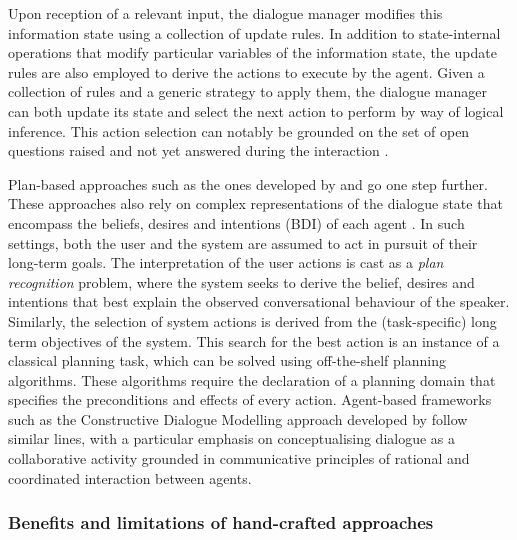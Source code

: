 Upon reception of a relevant input, the dialogue manager modifies this information state using a collection of update rules. In addition to state-internal operations that modify particular variables of the information state, the update rules are also employed to derive the actions to execute by the agent.  Given a collection of rules and a generic strategy to apply them, the dialogue manager can both update its state and select the next action to perform by way of logical inference. This action selection can notably be grounded on the set of open questions raised and not yet answered during the interaction \citep{larsson2002,Ginzburg2012}.  

Plan-based approaches such as the ones developed by \cite{Freedman:2000} and \cite{Allen:2001} go one step further. These approaches also rely on complex representations of the dialogue state that encompass the beliefs, desires and intentions (BDI) of each agent \citep{Cohen1979,Allen1980}.  In such settings, both the user and the system are assumed to act in pursuit of their long-term goals.  The interpretation of the user actions is cast as a \textit{plan recognition} problem, where the system seeks to derive the belief, desires and intentions that best explain the observed conversational behaviour of the speaker.  Similarly, the selection of system actions is derived from the (task-specific) long term objectives of the system. This search for the best action is an instance of a classical planning task, which can be solved using off-the-shelf planning algorithms. These algorithms require the declaration of a planning domain that specifies the preconditions and effects of every action. Agent-based frameworks such as the Constructive Dialogue Modelling approach developed by \cite{Jokinen:2009} follow similar lines, with a particular emphasis on conceptualising dialogue as a collaborative activity grounded in communicative principles of rational and coordinated interaction between agents. 

\subsubsection*{Benefits and limitations of hand-crafted approaches}

